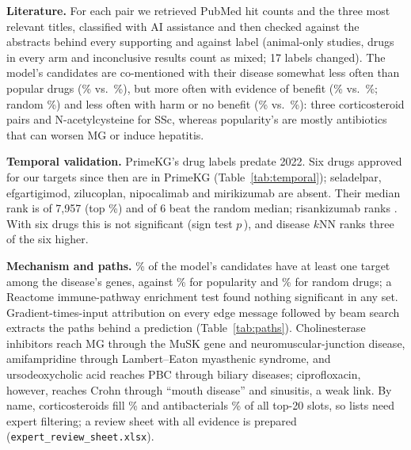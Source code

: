 \documentclass{ieeeaccess}
\newcommand{\sysname}{BioPathNet++\xspace}
\begin{document}
\textbf{Literature.} For each pair we retrieved PubMed hit counts and the three most relevant titles, classified with AI assistance and then checked against the abstracts behind every supporting and against label (animal-only studies, drugs in every arm and inconclusive results count as mixed; 17 labels changed). The model's candidates are co-mentioned with their disease somewhat less often than popular drugs (\ValLitHitModel\% vs.\ \ValLitHitPop\%), but more often with evidence of benefit (\ValLitSupModel\% vs.\ \ValLitSupPop\%; random \ValLitSupRand\%) and less often with harm or no benefit (\ValLitAgainstModel\% vs.\ \ValLitAgainstPop\%): three corticosteroid pairs and N-acetylcysteine for SSc, whereas popularity's are mostly antibiotics that can worsen MG or induce hepatitis.

\textbf{Temporal validation.} PrimeKG's drug labels predate 2022. Six drugs approved for our targets since then are in PrimeKG (Table~\ref{tab:temporal}); seladelpar, efgartigimod, zilucoplan, nipocalimab and mirikizumab are absent. Their median rank is \TempPostMedRank{} of 7,957 (top \TempPostMedPct\%) and \TempPostBetter{} of 6 beat the random median; risankizumab ranks \TempRankRisankizumab. With six drugs this is not significant (sign test $p$\,\TempPostP), and disease $k$NN ranks three of the six higher.

\begin{table}[!t]
\centering
\caption{Ranks among 7,957 drugs of drugs approved after the PrimeKG snapshot (top) and of earlier approvals missing from its labels (bottom). FDA: approval month; Rank: \sysname, mean over three seeds; $k$NN, Pop.: disease $k$NN and popularity. Drugs that treat no training disease score zero in both baselines and share their random tie-break, hence equal ranks.}
\label{tab:temporal}
\scriptsize
\setlength{\tabcolsep}{2.5pt}

\end{table}

\textbf{Mechanism and paths.} \ValDisGeneModel\% of the model's candidates have at least one target among the disease's genes, against \ValDisGenePop\% for popularity and \ValDisGeneRand\% for random drugs; a Reactome immune-pathway enrichment test found nothing significant in any set. Gradient-times-input attribution on every edge message followed by beam search~\cite{zhu2021nbfnet} extracts the paths behind a prediction (Table~\ref{tab:paths}). Cholinesterase inhibitors reach MG through the MuSK gene and neuromuscular-junction disease, amifampridine through Lambert--Eaton myasthenic syndrome, and ursodeoxycholic acid reaches PBC through biliary diseases; ciprofloxacin, however, reaches Crohn through ``mouth disease'' and sinusitis, a weak link. By name, corticosteroids fill \ValSteroidShare\% and antibacterials \ValAntibioticShare\% of all top-20 slots, so lists need expert filtering; a review sheet with all evidence is prepared (\texttt{expert\_review\_sheet.xlsx}).
\end{document}
